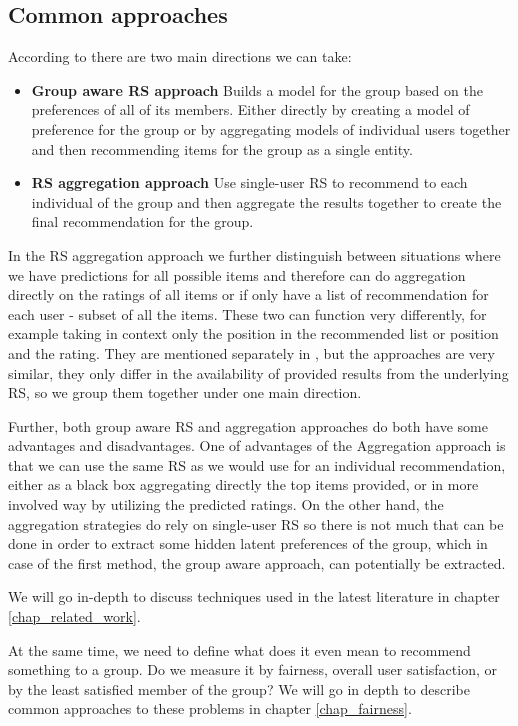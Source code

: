 \subsection*{Common approaches}
According to \cite{recommendations_to_groups-jameson2007} there are two main directions we can take:
\begin{itemize}
    \item \textbf{Group aware RS approach}\newline
    Builds a model for the group based on the preferences of all of its members. Either directly by creating a model of preference for the group or by aggregating models of individual users together and then recommending items for the group as a single entity.
    \item \textbf{RS aggregation approach}\newline
    Use single-user RS to recommend to each individual of the group and then aggregate the results together to create the final recommendation for the group.
    
\end{itemize}

In the RS aggregation approach we further distinguish between situations where we have predictions for all possible items and therefore can do aggregation directly on the ratings of all items or if only have a list of recommendation for each user - subset of all the items. These two can function very differently, for example taking in context only the position in the recommended list or position and the rating. They are mentioned separately in \cite{recommendations_to_groups-jameson2007}, but the approaches are very similar, they only differ in the availability of provided results from the underlying RS, so we group them together under one main direction.

Further, both group aware RS and aggregation approaches do both have some advantages and disadvantages. One of advantages of the Aggregation approach is that we can use the same RS as we would use for an individual recommendation, either as a black box aggregating directly the top items provided, or in more involved way by utilizing the predicted ratings. On the other hand, the aggregation strategies do rely on single-user RS so there is not much that can be done in order to extract some hidden latent preferences of the group, which in case of the first method, the group aware approach, can potentially be extracted.


We will go in-depth to discuss techniques used in the latest literature in chapter \ref{chap_related_work}.



At the same time, we need to define what does it even mean to recommend something to a group. Do we measure it by fairness, overall user satisfaction, or by the least satisfied member of the group? We will go in depth to describe common approaches to these problems in chapter \ref{chap_fairness}.

